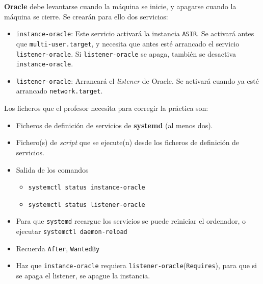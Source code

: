 \begin{homeworkProblem}

  \textbf{Oracle} debe levantarse cuando la máquina se inicie, y apagarse cuando la máquina se cierre. Se crearán para ello dos servicios:
  \begin{itemize}
  \item \texttt{instance-oracle}: Este servicio activará la instancia \texttt{ASIR}. Se activará antes que \texttt{multi-user.target}, y necesita que antes esté arrancado el servicio \texttt{listener-oracle}. Si \texttt{listener-oracle} se apaga, también se desactiva \texttt{instance-oracle}.
  \item \texttt{listener-oracle}: Arrancará el \textit{listener} de Oracle. Se activará cuando ya esté arrancado \texttt{network.target}.
  \end{itemize}

  Los ficheros que el profesor necesita para corregir la práctica son:
  \begin{itemize}
  \item Ficheros de definición de servicios de \textbf{systemd} (al menos dos).
  \item Fichero(s) de \textit{script} que se ejecute(n) desde los ficheros de definición de servicios.
  \item Salida de los comandos
    \begin{itemize}
    \item \texttt{systemctl status instance-oracle} 
    \item \texttt{systemctl status listener-oracle}
    \end{itemize}
  \end{itemize}

  \begin{Aviso}[Ayuda]
    \begin{itemize}
    \item Para que \texttt{systemd} recargue los servicios se puede reiniciar el ordenador, o ejecutar \texttt{systemctl daemon-reload}
    \item Recuerda \texttt{After}, \texttt{WantedBy}
    \item Haz que \texttt{instance-oracle} requiera \texttt{listener-oracle}(\texttt{Requires}), para que si se apaga el listener, se apague la instancia.
    \end{itemize}
  \end{Aviso}
\end{homeworkProblem}


